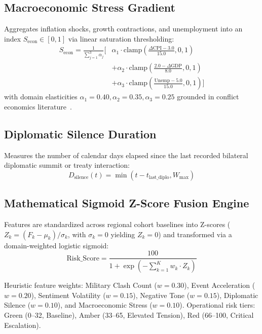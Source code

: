 \documentclass[preprint,12pt]{elsarticle}
\begin{document}
\subsection{Macroeconomic Stress Gradient}
Aggregates inflation shocks, growth contractions, and unemployment into an index $S_{\text{econ}} \in [0, 1]$ via linear saturation thresholding:
\begin{equation}
\begin{split}
S_{\text{econ}} = \frac{1}{\sum_{j=1}^3 \alpha_j} \Biggl[ & \alpha_1 \cdot \text{clamp}\left(\frac{\Delta \text{CPI} - 3.0}{15.0}, 0, 1\right) \\
& + \alpha_2 \cdot \text{clamp}\left(\frac{2.0 - \Delta \text{GDP}}{8.0}, 0, 1\right) \\
& + \alpha_3 \cdot \text{clamp}\left(\frac{\text{Unemp} - 5.0}{15.0}, 0, 1\right) \Biggr]
\end{split}
\end{equation}
with domain elasticities $\alpha_1 = 0.40, \alpha_2 = 0.35, \alpha_3 = 0.25$ grounded in conflict economics literature~\cite{mach2019climate, miguel2004economic}.

\subsection{Diplomatic Silence Duration}
Measures the number of calendar days elapsed since the last recorded bilateral diplomatic summit or treaty interaction:
\begin{equation}
D_{\text{silence}}(t) = \min(t - t_{\text{last\_diplo}}, W_{\max})
\end{equation}

\subsection{Mathematical Sigmoid Z-Score Fusion Engine}
Features are standardized across regional cohort baselines into Z-scores ($Z_k = (F_k - \mu_k)/\sigma_k$, with $\sigma_k = 0$ yielding $Z_k = 0$) and transformed via a domain-weighted logistic sigmoid:
\begin{equation}
\text{Risk\_Score} = \frac{100}{1 + \exp\left(-\sum_{k=1}^K w_k \cdot Z_k\right)}
\end{equation}

Heuristic feature weights: Military Clash Count ($w = 0.30$), Event Acceleration ($w = 0.20$), Sentiment Volatility ($w = 0.15$), Negative Tone ($w = 0.15$), Diplomatic Silence ($w = 0.10$), and Macroeconomic Stress ($w = 0.10$). Operational risk tiers: Green (0--32, Baseline), Amber (33--65, Elevated Tension), Red (66--100, Critical Escalation).
\end{document}
